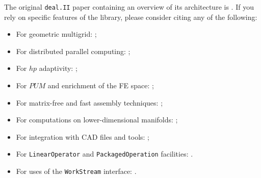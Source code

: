 \documentclass{ansarticle-preprint}
\newcommand{\specialword}[1]{\texttt{#1}}
\newcommand{\dealii}{{\specialword{deal.II}}}
\begin{document}

The original \texttt{\dealii{}} paper containing an overview of its
architecture is \cite{BangerthHartmannKanschat2007}. If you rely on specific
features of the library, please consider citing any of the following:
\begin{itemize}
 \item For geometric multigrid: \cite{Kanschat2004,JanssenKanschat2011};
 \item For distributed parallel computing: \cite{BangerthBursteddeHeisterKronbichler11};
 \item For $hp$ adaptivity: \cite{BangerthKayserHerold2007};
  \item For $PUM$ and enrichment of the FE space: \cite{Davydov2016};
 \item For matrix-free and fast assembly techniques:
   \cite{KronbichlerKormann2012};
 \item For computations on lower-dimensional manifolds:
   \cite{DeSimoneHeltaiManigrasso2009};
 \item For integration with CAD files and tools:
   \cite{HeltaiMola2015};
 \item For \texttt{LinearOperator} and \texttt{PackagedOperation} facilities:
   \cite{MaierBardelloniHeltai-2016-a,MaierBardelloniHeltai-2016-b}.
 \item For uses of the \texttt{WorkStream} interface:
   \cite{TKB16}.
\end{itemize}
\end{document}

